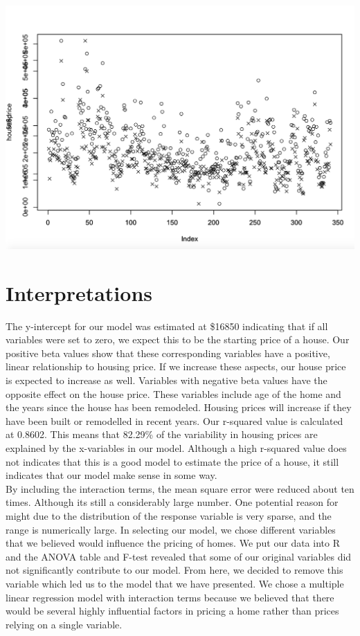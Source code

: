 \documentclass{article}
\begin{document}
\includegraphics[scale = 0.5]{result.png}


\section*{Interpretations}
 The y-intercept for our model was estimated at \$16850 indicating that if all variables were set to zero, we expect this to be the starting price of a house. Our positive beta values show that these corresponding variables have a positive, linear relationship to housing price. If we increase these aspects, our house price is expected to increase as well. Variables with negative beta values have the opposite effect on the house price. These variables include age of the home and the years since the house has been remodeled. Housing prices will increase if they have been built or remodelled in recent years. Our r-squared value is calculated at 0.8602. This means that 82.29\% of the variability in housing prices are explained by the x-variables in our model. Although a high r-squared value does not indicates that this is a good model to estimate the price of a house, it still indicates that our model make sense in some way.\\
 By including the interaction terms, the mean square error were reduced about ten times. Although its still a considerably large number. One potential reason for might due to the distribution of the response variable is very sparse, and the range is numerically large. In selecting our model, we chose different variables that we believed would influence the pricing of homes. We put our data into R and the ANOVA table and F-test revealed that some of our original variables did not significantly contribute to our model. From here, we decided to remove this variable which led us to the model that we have presented. We chose a multiple linear regression model with interaction terms because we believed that there would be several highly influential factors in pricing a home rather than prices relying on a single variable.
\end{document}
